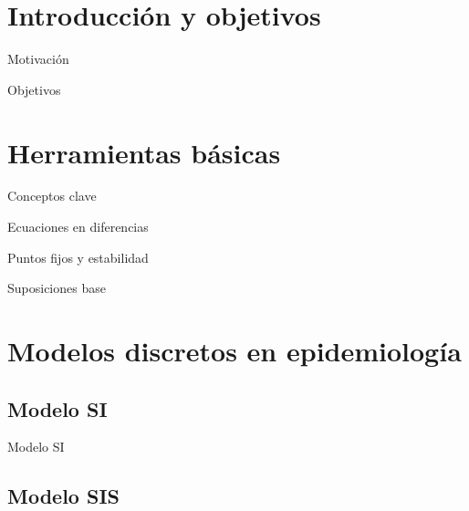 \section{Introducción y objetivos}


\begin{frame}{Motivación}

\end{frame}


\begin{frame}{Objetivos}

\end{frame}




\section{Herramientas básicas}


\begin{frame}{Conceptos clave}

\end{frame}


\begin{frame}{Ecuaciones en diferencias}

\end{frame}


\begin{frame}{Puntos fijos y estabilidad}

\end{frame}


\begin{frame}{Suposiciones base}

\end{frame}




\section{Modelos discretos en epidemiología}


\subsection{Modelo SI}


\begin{frame}{Modelo SI}

\end{frame}


\subsection{Modelo SIS}


